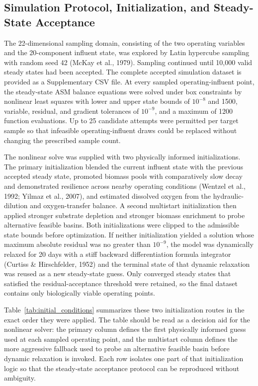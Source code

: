 \documentclass[a4paper,fleqn]{cas-sc}
\newenvironment{revblock}{}{}
\newenvironment{revblockr116}{}{}
\begin{document}
\begin{revblock}
\begin{revblockr116}
\subsection{Simulation Protocol, Initialization, and Steady-State Acceptance}

The 22-dimensional sampling domain, consisting of the two operating variables and the 20-component influent state, was explored by Latin hypercube sampling with random seed 42 (McKay et al., 1979). Sampling continued until 10,000 valid steady states had been accepted. The complete accepted simulation dataset is provided as a Supplementary CSV file. At every sampled operating-influent point, the steady-state ASM balance equations were solved under box constraints by nonlinear least squares with lower and upper state bounds of $10^{-8}$ and 1500, variable, residual, and gradient tolerances of $10^{-9}$, and a maximum of 1200 function evaluations. Up to 25 candidate attempts were permitted per target sample so that infeasible operating-influent draws could be replaced without changing the prescribed sample count.

The nonlinear solve was supplied with two physically informed initializations. The primary initialization blended the current influent state with the previous accepted steady state, promoted biomass pools with comparatively slow decay and demonstrated resilience across nearby operating conditions (Wentzel et al., 1992; Yilmaz et al., 2007), and estimated dissolved oxygen from the hydraulic-dilution and oxygen-transfer balance. A second multistart initialization then applied stronger substrate depletion and stronger biomass enrichment to probe alternative feasible basins. Both initializations were clipped to the admissible state bounds before optimization. If neither initialization yielded a solution whose maximum absolute residual was no greater than $10^{-9}$, the model was dynamically relaxed for 20 days with a stiff backward differentiation formula integrator (Curtiss \& Hirschfelder, 1952) and the terminal state of that dynamic relaxation was reused as a new steady-state guess. Only converged steady states that satisfied the residual-acceptance threshold were retained, so the final dataset contains only biologically viable operating points.

Table~\ref{tab:initial_conditions} summarizes these two initialization routes in the exact order they were applied. The table should be read as a decision aid for the nonlinear solver: the primary column defines the first physically informed guess used at each sampled operating point, and the multistart column defines the more aggressive fallback used to probe an alternative feasible basin before dynamic relaxation is invoked. Each row isolates one part of that initialization logic so that the steady-state acceptance protocol can be reproduced without ambiguity.


\end{revblockr116}
\end{revblock}
\end{document}
